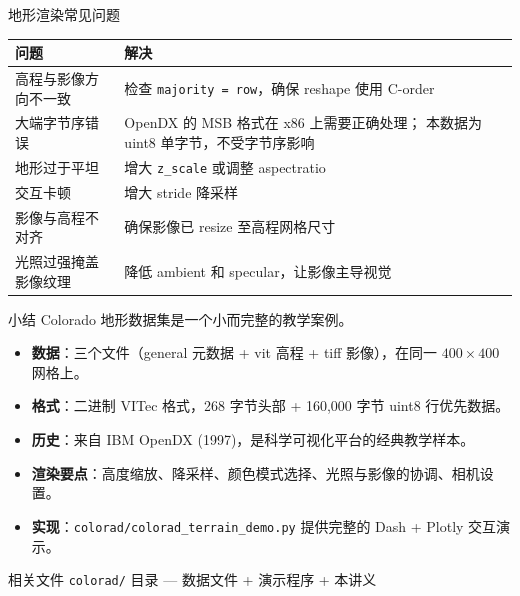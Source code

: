 \documentclass[aspectratio=169,11pt]{ctexbeamer}
\begin{document}
\begin{frame}{地形渲染常见问题}

  \begin{table}
    \centering
    \begin{tabularx}{\linewidth}{lX}
      \toprule
      问题 & 解决 \\
      \midrule
      高程与影像方向不一致 & 检查 \texttt{majority = row}，确保 reshape 使用 C-order \\
      大端字节序错误 & OpenDX 的 MSB 格式在 x86 上需要正确处理；
                         本数据为 uint8 单字节，不受字节序影响 \\
      地形过于平坦 & 增大 \texttt{z\_scale} 或调整 aspectratio \\
      交互卡顿 & 增大 stride 降采样 \\
      影像与高程不对齐 & 确保影像已 resize 至高程网格尺寸 \\
      光照过强掩盖影像纹理 & 降低 ambient 和 specular，让影像主导视觉 \\
      \bottomrule
    \end{tabularx}
  \end{table}
\end{frame}

\begin{frame}{小结}
  Colorado 地形数据集是一个小而完整的教学案例。

  \begin{itemize}
    \item \textbf{数据}：三个文件（general 元数据 + vit 高程 + tiff 影像），在同一 $400\times400$ 网格上。
    \item \textbf{格式}：二进制 VITec 格式，268 字节头部 + 160,000 字节 uint8 行优先数据。
    \item \textbf{历史}：来自 IBM OpenDX (1997)，是科学可视化平台的经典教学样本。
    \item \textbf{渲染要点}：高度缩放、降采样、颜色模式选择、光照与影像的协调、相机设置。
    \item \textbf{实现}：\texttt{colorad/colorad\_terrain\_demo.py} 提供完整的 Dash + Plotly 交互演示。
  \end{itemize}

  \begin{block}{相关文件}
    \texttt{colorad/} 目录 — 数据文件 + 演示程序 + 本讲义
  \end{block}
\end{frame}
\end{document}
